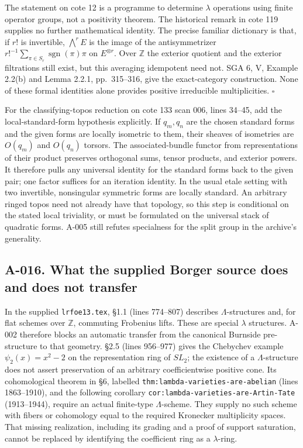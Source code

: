The statement on cote 12 is a programme to determine $\lambda$
operations using finite operator groups, not a positivity theorem.
The historical remark in cote 119 supplies no further mathematical
identity. The precise familiar dictionary is that, if $r!$ is
invertible, $\bigwedge^r E$ is the image of the antisymmetrizer
$r!^{-1}\sum_{\pi\in S_r}\operatorname{sgn}(\pi)\pi$ on
$E^{\otimes r}$. Over $\mathbb Z$ the exterior quotient and the
exterior filtrations still exist, but this averaging idempotent
need not. SGA 6, V, Example 2.2(b) and Lemma 2.2.1, pp.~315--316,
give the exact-category construction. None of these formal
identities alone provides positive irreducible multiplicities.
\hfill$\square$

For the classifying-topos reduction on cote 133 scan 006, lines
34--45, add the local-standard-form hypothesis explicitly. If
$q_m,q_n$ are the chosen standard forms and the given forms are
locally isometric to them, their sheaves of isometries are
$O(q_m)$ and $O(q_n)$ torsors. The associated-bundle functor from
representations of their product preserves orthogonal sums,
tensor products, and exterior powers. It therefore pulls any
universal identity for the standard forms back to the given pair;
one factor suffices for an iteration identity. In the usual etale
setting with two invertible, nonsingular symmetric forms are
locally standard. An arbitrary ringed topos need not already have
that topology, so this step is conditional on the stated local
triviality, or must be formulated on the universal stack of
quadratic forms. A-005 still refutes specialness for the split
group in the archive's generality.

\subsection*{A-016. What the supplied Borger source does and does not transfer}
In the supplied \texttt{lrfoe13.tex}, \S1.1 (lines 774--807)
describes $\Lambda$-structures and, for flat schemes over
$\mathbb Z$, commuting Frobenius lifts. These are special
$\lambda$ structures. A-002 therefore blocks an automatic transfer
from the canonical Burnside pre-structure to that geometry.
\S2.5 (lines 956--977) gives the Chebychev example
$\psi_2(x)=x^2-2$ on the representation ring of $SL_2$;
the existence of a $\Lambda$-structure does not assert preservation
of an arbitrary coefficientwise positive cone. Its cohomological
theorem in \S6, labelled
\texttt{thm:lambda-varieties-are-abelian} (lines 1863--1910), and
the following corollary
\texttt{cor:lambda-varieties-are-Artin-Tate} (1913--1944), require
an actual finite-type $\Lambda$-scheme. They supply no such scheme
with fibers or cohomology equal to the required Kronecker
multiplicity spaces. That missing realization, including its
grading and a proof of support saturation, cannot be replaced
by identifying the coefficient ring as a $\lambda$-ring.

